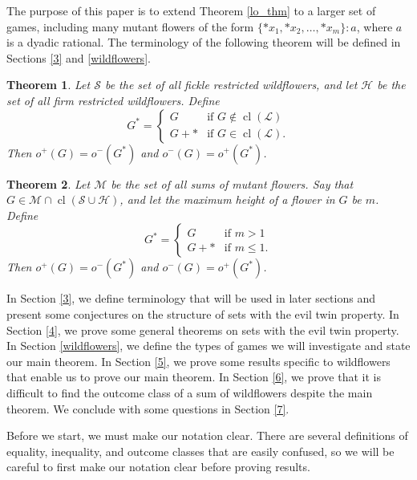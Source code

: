 \documentclass{amsart}
\theoremstyle{plain}
\newtheorem{thm}{Theorem}
\theoremstyle{definition}
\theoremstyle{remark}
\numberwithin{equation}{section}
\numberwithin{thm}{section}
\DeclareMathOperator{\cl}{cl}
\begin{document}
The purpose of this paper is to extend Theorem \ref{lo_thm} to a larger set of games, including many mutant flowers of the form $\{*x_1,*x_2,\dots,*x_m\}:a$, where $a$ is a dyadic rational. The terminology of the following theorem will be defined in Sections \ref{3} and \ref{wildflowers}.  \begin{thm}
  \label{main theorem 1, minus teminology}
    Let $\mathscr{S}$ be the set of all fickle restricted wildflowers, and let $\mathscr{H}$ be the set of all firm restricted wildflowers. Define
    \begin{equation}
        G^* = \begin{cases}
            G & \text{if } G \notin \cl(\mathscr{L}) \\
            G+* & \text{if } G \in \cl(\mathscr{L}).
        \end{cases}
    \end{equation}Then $o^+(G) = o^-(G^*)$ and $o^-(G) = o^+(G^*)$. 
\end{thm}

\begin{thm}
 \label{main theorem for mutant flowers, minus terminology}
    Let $\mathscr{M}$ be the set of all sums of mutant flowers. Say that $G \in\mathscr{M} \cap \cl(\mathscr{S}\cup \mathscr{H}) $, and let the maximum height of a flower in $G$ be $m$. Define \begin{equation}
        G^* = \begin{cases}
            G & \text{if } m > 1 \\
            G+* & \text{if } m\leq 1.
        \end{cases}
    \end{equation}
    Then $o^+(G) = o^-(G^*)$ and $o^-(G) = o^+(G^*)$. 
\end{thm}

In Section \ref{3}, we define terminology that will be used in later sections and present some conjectures on the structure of sets with the evil twin property. In Section \ref{4}, we prove some general theorems on sets with the evil twin property. In Section \ref{wildflowers}, we define the types of games we will investigate and state our main theorem. In Section \ref{5}, we prove some results specific to wildflowers that enable us to prove our main theorem. In Section \ref{6}, we prove that it is difficult to find the outcome class of a sum of wildflowers despite the main theorem. We conclude with some questions in Section \ref{7}.

Before we start, we must make our notation clear. There are several definitions of equality, inequality,  and outcome classes that are easily confused, so we will be careful to first make our notation clear before proving results.
\end{document}
